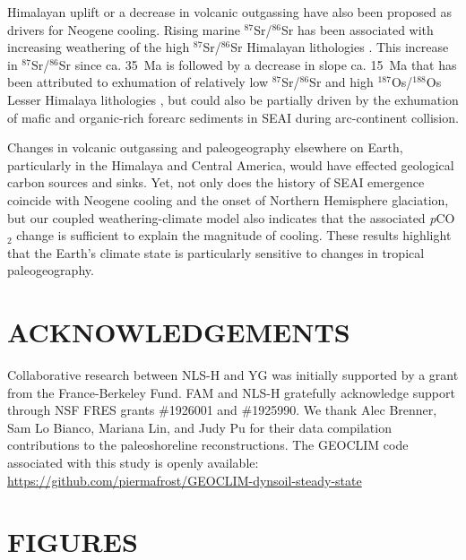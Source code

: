 \documentclass[11pt,letterpaper]{article}
\newcommand{\SrSr}{$^{87}$Sr/$^{86}$Sr\xspace}
\newcommand{\OsOs}{$^{187}$Os/$^{188}$Os\xspace}
\newcommand{\pCOtwo}{\textit{p}CO$_{2}$\xspace}
\begin{document}
Himalayan uplift \cite{Raymo1992a} or a decrease in volcanic outgassing \cite{Berner1983a} have also been proposed as drivers for Neogene cooling. Rising marine \SrSr has been associated with increasing weathering of the high \SrSr Himalayan lithologies \cite{Raymo1992a}. This increase in \SrSr since ca. 35~Ma is followed by a decrease in slope ca. 15~Ma that has been attributed to exhumation of relatively low \SrSr and high \OsOs Lesser Himalaya lithologies \cite{Colleps2018a}, but could also be partially driven by the exhumation of mafic and organic-rich forearc sediments in SEAI during arc-continent collision.

Changes in volcanic outgassing and paleogeography elsewhere on Earth, particularly in the Himalaya and Central America, would have effected geological carbon sources and sinks. Yet, not only does the history of SEAI emergence coincide with Neogene cooling and the onset of Northern Hemisphere glaciation, but our coupled weathering-climate model also indicates that the associated \pCOtwo change is sufficient to explain the magnitude of cooling. These results highlight that the Earth's climate state is particularly sensitive to changes in tropical paleogeography.

\section*{ACKNOWLEDGEMENTS \label{sec:ACKNOWLEDGEMENTS}}

Collaborative research between NLS-H and YG was initially supported by a grant from the France-Berkeley Fund. FAM and NLS-H gratefully acknowledge support through NSF FRES grants \#1926001 and \#1925990. We thank Alec Brenner, Sam Lo Bianco, Mariana Lin, and Judy Pu for their data compilation contributions to the paleoshoreline reconstructions. The GEOCLIM code associated with this study is openly available: \url{https://github.com/piermafrost/GEOCLIM-dynsoil-steady-state}

\clearpage
\newpage

\section*{FIGURES}
\end{document}
